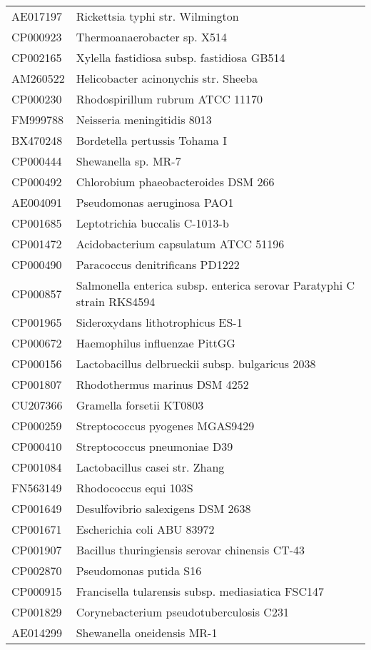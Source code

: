 \begin{longtable}{ll}
AE017197 & Rickettsia typhi str. Wilmington\\
CP000923 & Thermoanaerobacter sp. X514\\
CP002165 & Xylella fastidiosa subsp. fastidiosa GB514\\
AM260522 & Helicobacter acinonychis str. Sheeba\\
CP000230 & Rhodospirillum rubrum ATCC 11170\\
FM999788 & Neisseria meningitidis 8013\\
BX470248 & Bordetella pertussis Tohama I\\
CP000444 & Shewanella sp. MR-7\\
CP000492 & Chlorobium phaeobacteroides DSM 266\\
AE004091 & Pseudomonas aeruginosa PAO1\\
CP001685 & Leptotrichia buccalis C-1013-b\\
CP001472 & Acidobacterium capsulatum ATCC 51196\\
CP000490 & Paracoccus denitrificans PD1222\\
CP000857 & Salmonella enterica subsp. enterica serovar Paratyphi C strain RKS4594\\
CP001965 & Sideroxydans lithotrophicus ES-1\\
CP000672 & Haemophilus influenzae PittGG\\
CP000156 & Lactobacillus delbrueckii subsp. bulgaricus 2038\\
CP001807 & Rhodothermus marinus DSM 4252\\
CU207366 & Gramella forsetii KT0803\\
CP000259 & Streptococcus pyogenes MGAS9429\\
CP000410 & Streptococcus pneumoniae D39\\
CP001084 & Lactobacillus casei str. Zhang\\
FN563149 & Rhodococcus equi 103S\\
CP001649 & Desulfovibrio salexigens DSM 2638\\
CP001671 & Escherichia coli ABU 83972\\
CP001907 & Bacillus thuringiensis serovar chinensis CT-43\\
CP002870 & Pseudomonas putida S16\\
CP000915 & Francisella tularensis subsp. mediasiatica FSC147\\
CP001829 & Corynebacterium pseudotuberculosis C231\\
AE014299 & Shewanella oneidensis MR-1\\

\end{longtable}
